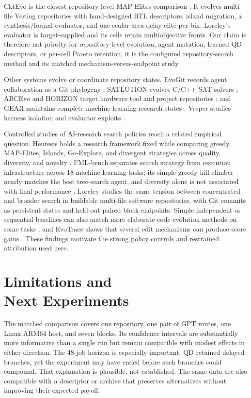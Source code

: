 \documentclass[10pt,twocolumn]{article}
\begin{document}
CktEvo is the closest repository-level MAP-Elites comparison
\citep{shi2026cktevo}. It evolves multi-file Verilog repositories with
hand-designed RTL descriptors, island migration, a synthesis/formal evaluator,
and one scalar area-delay elite per bin. Loreley's evaluator is target-supplied
and its cells retain multiobjective fronts. Our claim is therefore not priority
for repository-level evolution, agent mutation, learned QD descriptors, or
per-cell Pareto retention; it is the configured repository-search method and
its matched mechanism-versus-endpoint study.

Other systems evolve or coordinate repository states. EvoGit records agent
collaboration as a Git phylogeny \citep{huang2025evogit}; SATLUTION evolves
C/C++ SAT solvers \citep{yu2025satlution}; ABCEvo and HORIZON target hardware
tool and project repositories \citep{yu2026abcevo,yu2026horizon}; and GEAR
maintains complete machine-learning research states \citep{jeddi2026gear}.
Vesper studies harness isolation and evaluator exploits
\citep{ishibashi2026vesper}.

Controlled studies of AI-research search policies reach a related empirical
question. Heuresis holds a research framework fixed while comparing greedy,
MAP-Elites, Islands, Go-Explore, and divergent strategies across quality,
diversity, and novelty \citep{antoniades2026heuresis}. FML-bench separates
search strategy from execution infrastructure across 18 machine-learning
tasks; its simple greedy hill climber nearly matches the best tree-search
agent, and diversity alone is not associated with final performance
\citep{zou2026fmlbench}. Loreley studies the same tension between concentrated
and broader search in buildable multi-file software repositories, with Git
commits as persistent states and held-out paired-block endpoints. Simple
independent or sequential baselines can also match more elaborate code-evolution
methods on some tasks \citep{gideoni2026baselines}, and EvoTrace shows that
several edit mechanisms can produce score gains \citep{pelleriti2026evotrace}.
These findings motivate the strong policy controls and restrained attribution
used here.

\section[Limitations and Next Experiments]
        {Limitations and\\Next Experiments}
\label{sec:limitations}

The matched comparison covers one repository, one pair of GPT routes, one
Linux ARM64 host, and seven blocks. Its confidence intervals are substantially
more informative than a single run but remain compatible with modest effects
in either direction. The 48-job horizon is especially important: QD retained
delayed branches, yet the experiment may have ended before such branches could
compound. That explanation is plausible, not established. The same data are
also compatible with a descriptor or archive that preserves alternatives
without improving their expected payoff.
\end{document}
